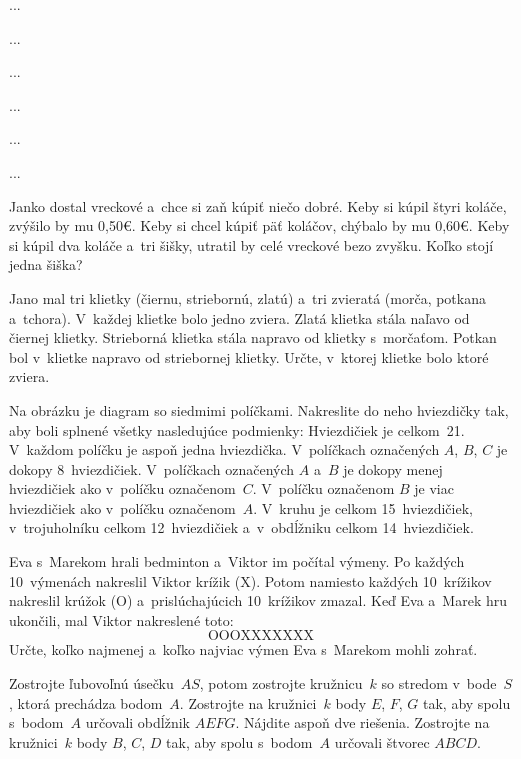 ﻿{%
...}

{%
...}

{%
...}

{%
...}

{%
...}

{%
...}

{%
Janko dostal vreckové a~chce si zaň kúpiť niečo dobré.
Keby si kúpil štyri koláče, zvýšilo by mu 0,50€.
Keby si chcel kúpiť päť koláčov, chýbalo by mu 0,60€.
Keby si kúpil dva koláče a~tri šišky, utratil by celé vreckové bezo zvyšku.
Koľko stojí jedna šiška?}

{%
Jano mal tri klietky (čiernu, striebornú, zlatú) a~tri zvieratá (morča, potkana a~tchora).
V~každej klietke bolo jedno zviera.
Zlatá klietka stála naľavo od čiernej klietky.
Strieborná klietka stála napravo od klietky s~morčaťom.
Potkan bol v~klietke napravo od striebornej klietky.
Určte, v~ktorej klietke bolo ktoré zviera.}

{%
Na obrázku je diagram so siedmimi políčkami.
Nakreslite do neho hviezdičky tak, aby boli splnené všetky nasledujúce podmienky:
\ite{$\bullet$} Hviezdičiek je celkom~21.
\ite{$\bullet$} V~každom políčku je aspoň jedna hviezdička.
\ite{$\bullet$} V~políčkach označených $A$, $B$, $C$ je dokopy 8~hviezdičiek.
\ite{$\bullet$} V~políčkach označených $A$ a~$B$ je dokopy menej hviezdičiek ako v~políčku označenom~$C$.
\ite{$\bullet$} V~políčku označenom $B$ je viac hviezdičiek ako v~políčku označenom~$A$.
\ite{$\bullet$} V~kruhu je celkom 15~hviezdičiek, v~trojuholníku celkom 12~hviezdičiek
a~v~obdĺžniku celkom 14~hviezdičiek.\endgraf%
~
}

{%
Eva s~Marekom hrali bedminton a~Viktor im počítal výmeny.
Po každých 10~výmenách nakreslil Viktor krížik (X).
Potom namiesto každých 10~krížikov nakreslil krúžok (O) a~prislúchajúcich 10~krížikov zmazal.
Keď Eva a~Marek hru ukončili, mal Viktor nakreslené toto:
$$
\text{OOOXXXXXXX}
$$
Určte, koľko najmenej a~koľko najviac výmen Eva s~Marekom mohli zohrať.}

{%
Zostrojte ľubovoľnú úsečku~$AS$, potom zostrojte kružnicu~$k$ so stredom v~bode~$S$, ktorá prechádza bodom~$A$.
 Zostrojte na kružnici~$k$ body $E$, $F$, $G$ tak, aby spolu s~bodom~$A$ určovali obdĺžnik $AEFG$.
Nájdite aspoň dve riešenia.
 Zostrojte na kružnici~$k$ body $B$, $C$, $D$ tak, aby spolu s~bodom~$A$ určovali štvorec $ABCD$.\endgraf
}

